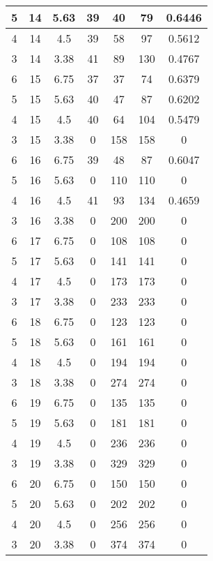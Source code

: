 \documentclass[letterpaper, 12pt]{article}
\begin{document}
\begin{longtable}{|c|c|c|c|c|c|c|}
\hline
5 & 14 & 5.63 & 39 & 40 & 79 & 0.6446 \\
\hline
4 & 14 & 4.5 & 39 & 58 & 97 & 0.5612 \\
\hline
3 & 14 & 3.38 & 41 & 89 & 130 & 0.4767 \\
\hline
6 & 15 & 6.75 & 37 & 37 & 74 & 0.6379 \\
\hline
5 & 15 & 5.63 & 40 & 47 & 87 & 0.6202 \\
\hline
4 & 15 & 4.5 & 40 & 64 & 104 & 0.5479 \\
\hline
3 & 15 & 3.38 & 0 & 158 & 158 & 0 \\
\hline
6 & 16 & 6.75 & 39 & 48 & 87 & 0.6047 \\
\hline
5 & 16 & 5.63 & 0 & 110 & 110 & 0 \\
\hline
4 & 16 & 4.5 & 41 & 93 & 134 & 0.4659 \\
\hline
3 & 16 & 3.38 & 0 & 200 & 200 & 0 \\
\hline
6 & 17 & 6.75 & 0 & 108 & 108 & 0 \\
\hline
5 & 17 & 5.63 & 0 & 141 & 141 & 0 \\
\hline
4 & 17 & 4.5 & 0 & 173 & 173 & 0 \\
\hline
3 & 17 & 3.38 & 0 & 233 & 233 & 0 \\
\hline
6 & 18 & 6.75 & 0 & 123 & 123 & 0 \\
\hline
5 & 18 & 5.63 & 0 & 161 & 161 & 0 \\
\hline
4 & 18 & 4.5 & 0 & 194 & 194 & 0 \\
\hline
3 & 18 & 3.38 & 0 & 274 & 274 & 0 \\
\hline
6 & 19 & 6.75 & 0 & 135 & 135 & 0 \\
\hline
5 & 19 & 5.63 & 0 & 181 & 181 & 0 \\
\hline
4 & 19 & 4.5 & 0 & 236 & 236 & 0 \\
\hline
3 & 19 & 3.38 & 0 & 329 & 329 & 0 \\
\hline
6 & 20 & 6.75 & 0 & 150 & 150 & 0 \\
\hline
5 & 20 & 5.63 & 0 & 202 & 202 & 0 \\
\hline
4 & 20 & 4.5 & 0 & 256 & 256 & 0 \\
\hline
3 & 20 & 3.38 & 0 & 374 & 374 & 0 \\
\hline
\end{longtable}
\end{document}
